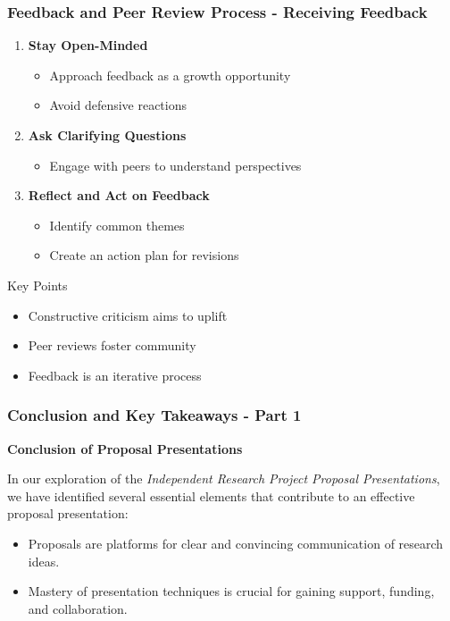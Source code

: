\documentclass[aspectratio=169]{beamer}
\begin{document}
\begin{frame}[fragile]
    \frametitle{Feedback and Peer Review Process - Receiving Feedback}
    \begin{enumerate}
        \item \textbf{Stay Open-Minded}
            \begin{itemize}
                \item Approach feedback as a growth opportunity
                \item Avoid defensive reactions
            \end{itemize}
        \item \textbf{Ask Clarifying Questions}
            \begin{itemize}
                \item Engage with peers to understand perspectives
            \end{itemize}
        \item \textbf{Reflect and Act on Feedback}
            \begin{itemize}
                \item Identify common themes
                \item Create an action plan for revisions
            \end{itemize}
    \end{enumerate}
    \begin{block}{Key Points}
        \begin{itemize}
            \item Constructive criticism aims to uplift
            \item Peer reviews foster community
            \item Feedback is an iterative process
        \end{itemize}
    \end{block}
\end{frame}

\begin{frame}[fragile]
    \frametitle{Conclusion and Key Takeaways - Part 1}
    \textbf{Conclusion of Proposal Presentations}
    
    In our exploration of the \textit{Independent Research Project Proposal Presentations}, we have identified several essential elements that contribute to an effective proposal presentation:
    \begin{itemize}
        \item Proposals are platforms for clear and convincing communication of research ideas.
        \item Mastery of presentation techniques is crucial for gaining support, funding, and collaboration.
    \end{itemize}
\end{frame}
\end{document}
